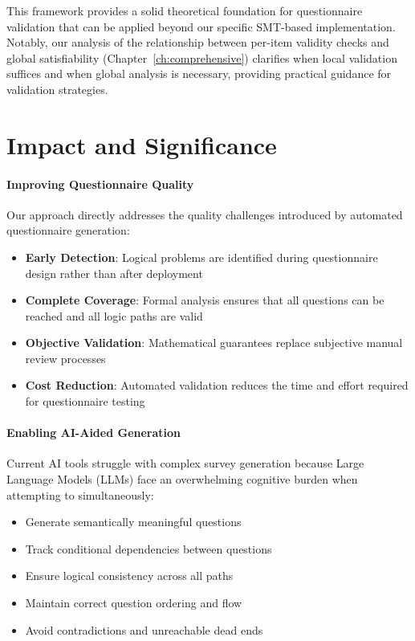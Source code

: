 This framework provides a solid theoretical foundation for questionnaire validation that can be applied beyond our specific SMT-based implementation. Notably, our analysis of the relationship between per-item validity checks and global satisfiability (Chapter~\ref{ch:comprehensive}) clarifies when local validation suffices and when global analysis is necessary, providing practical guidance for validation strategies.

\section{Impact and Significance}

\paragraph{Improving Questionnaire Quality}

Our approach directly addresses the quality challenges introduced by automated questionnaire generation:

\begin{itemize}
    \item \textbf{Early Detection}: Logical problems are identified during questionnaire design rather than after deployment
    \item \textbf{Complete Coverage}: Formal analysis ensures that all questions can be reached and all logic paths are valid
    \item \textbf{Objective Validation}: Mathematical guarantees replace subjective manual review processes
    \item \textbf{Cost Reduction}: Automated validation reduces the time and effort required for questionnaire testing
\end{itemize}

\paragraph{Enabling AI-Aided Generation}

Current AI tools struggle with complex survey generation because Large Language Models (LLMs) face an overwhelming cognitive burden when attempting to simultaneously:
\begin{itemize}
    \item Generate semantically meaningful questions
    \item Track conditional dependencies between questions
    \item Ensure logical consistency across all paths
    \item Maintain correct question ordering and flow
    \item Avoid contradictions and unreachable dead ends
\end{itemize}


